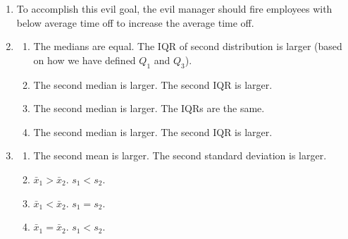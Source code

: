 \documentclass[12pt,letterpaper]{article}
\begin{document}
\begin{enumerate}
\item To accomplish this evil goal, the evil manager should fire employees with below average time off to increase the average time off.

\item \begin{enumerate}
\item The medians are equal. The IQR of second distribution is larger (based on how we have defined $Q_1$ and $Q_3$).
\item The second median is larger. The second IQR is larger.
\item The second median is larger. The IQRs are the same.
\item The second median is larger. The second IQR is larger.
\end{enumerate}

\item \begin{enumerate}
\item The second mean is larger. The second standard deviation is larger.
\item $\bar{x}_1 > \bar{x}_2$. $s_1 < s_2$.
\item $\bar{x}_1 < \bar{x}_2$. $s_1 = s_2$.
\item $\bar{x}_1 = \bar{x}_2$. $s_1 < s_2$.
\end{enumerate}



\end{enumerate}
\end{document}
